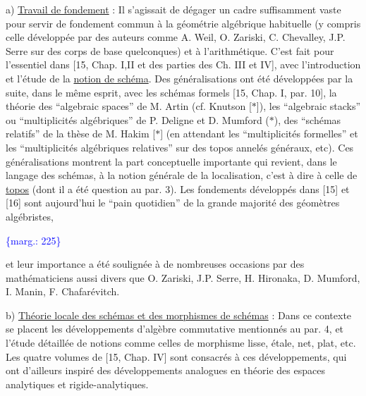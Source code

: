 \documentclass[11pt]{article}
\newcommand{\scanpage}[1]{\par\bigskip\noindent{\small\sffamily[scan #1]}\par}
\newcommand{\mspage}[1]{{\small\sffamily[p.\,#1]}}
\newcommand{\margin}[1]{\textcolor{blue}{\{\textsf{marg.:} #1\}}}
\newcommand{\uline}[1]{\underline{#1}}
\begin{document}
a) \uline{Travail de fondement} : Il s'agissait de dégager
un cadre suffisamment vaste pour servir de fondement
commun à la géométrie algébrique habituelle (y compris
celle développée par des auteurs comme A. Weil,
O. Zariski, C. Chevalley, J.P. Serre sur des corps de
base quelconques) et à l'arithmétique. C'est fait pour
l'essentiel dans [15, Chap. I,II et des parties des
Ch. III et IV], avec l'introduction et l'étude de la
\uline{notion de schéma}. Des généralisations ont été développées
par la suite, dans le même esprit, avec les schémas
formels [15, Chap. I, par. 10], la théorie des
``algebraic spaces'' de M. Artin (cf. Knutson [$*$]), les
``algebraic stacks'' ou ``multiplicités algébriques'' de
P. Deligne et D. Mumford ($*$), des ``schémas relatifs''
de la thèse de M. Hakim [$*$] (en attendant les
``multiplicités formelles'' et les ``multiplicités algébriques
relatives'' sur des topos annelés généraux, etc). Ces
généralisations montrent la part conceptuelle importante
qui revient, dans le langage des schémas, à la notion
générale de la localisation, c'est à dire à celle de
\uline{topos} (dont il a été question au par. 3). Les fondements
développés dans [15] et [16] sont aujourd'hui le ``pain
quotidien'' de la grande majorité des géomètres algébristes,

\margin{225}

\clearpage
\scanpage{119/226}
\mspage{. 13 .}

et leur importance a été soulignée à de nombreuses
occasions par des mathématiciens aussi divers que
O. Zariski, J.P. Serre, H. Hironaka, D. Mumford, I. Manin,
F. Chafarévitch.

b) \uline{Théorie locale des schémas et des morphismes de schémas} :
Dans ce contexte se placent les développements d'algèbre
commutative mentionnés au par. 4, et l'étude détaillée
de notions comme celles de morphisme lisse, étale,
net, plat, etc. Les quatre volumes de [15, Chap. IV]
sont consacrés à ces développements, qui ont d'ailleurs
inspiré des développements analogues en théorie des
espaces analytiques et rigide-analytiques.
\end{document}
